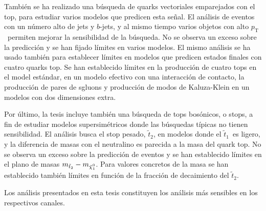 \documentclass{article}
\def\stoptwo{\ensuremath{\tilde{t}_2}}
\def\stopone{\ensuremath{\tilde{t}_1}}
\def\pt{\ensuremath{p_{\mathrm{T}}}} %
\def\neutralino{\ensuremath{\mathchoice%
      {\displaystyle\raise.4ex\hbox{$\displaystyle\tilde\chi^0_1$}}%
         {\textstyle\raise.4ex\hbox{$\textstyle\tilde\chi^0_1$}}%
       {\scriptstyle\raise.3ex\hbox{$\scriptstyle\tilde\chi^0_1$}}%
 {\scriptscriptstyle\raise.3ex\hbox{$\scriptscriptstyle\tilde\chi^0_1$}}}}
\begin{document}
Tambi\'en se ha realizado una b\'usqueda de quarks vectoriales emparejados con el
top, para estudiar varios modelos que predicen esta se\~nal.
El an\'alisis de eventos con un n\'umero alto de jets y $b$-jets, y al mismo
tiempo varios objetos con alto \pt\ permiten mejorar la sensibilidad de la
b\'usqueda. No se observa un exceso sobre la predicci\'on y se
han fijado l\'imites en varios modelos.
El mismo an\'alisis se ha usado tambi\'en para establecer l\'imites en modelos que
predicen estados finales con cuatro quarks top. Se han establecido l\'imites en
la producci\'on de cuatro tops en el model est\'andar, en un modelo efectivo con
una interacci\'on de contacto, la producci\'on de pares de sgluons y producci\'on de
modos de Kaluza-Klein en un modelos con dos dimensiones extra.

Por \'ultimo, la tesis incluye tambi\'en una b\'usqueda de tops bos\'onicos, o stops,
a fin de estudiar modelos supersim\'etricos donde las b\'usquedas t\'ipicas no
tienen sensibilidad. El an\'alisis busca el stop pesado, \stoptwo, en modelos
donde el \stopone\ es ligero, y la diferencia de masas con el neutralino es
parecida a la masa del quark top. No se observa un exceso sobre la predicci\'on
de eventos y se han establecido l\'imites en el plano de masas
$m_{\stoptwo}-m_{\neutralino}$.
Para valores concretos de la masa se han establecido tambi\'en l\'imites en
funci\'on de la fracci\'on de decaimiento del  \stoptwo.

Los an\'alisis presentados en esta tesis constituyen los an\'alisis m\'as sensibles
en los respectivos canales. 
\end{document}
